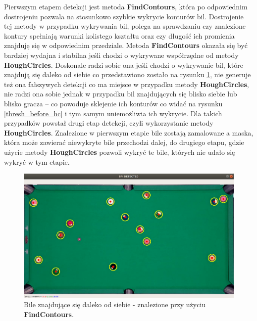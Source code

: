 \documentclass[12pt]{article}
\begin{document}
    Pierwszym etapem detekcji jest metoda \textbf{FindContours}, która po odpowiednim dostrojeniu pozwala na stosunkowo szybkie wykrycie konturów bil. Dostrojenie tej metody w przypadku wykrywania bil, polega na sprawdzaniu czy znalezione kontury spełniają warunki kolistego kształtu oraz czy długość ich promienia znajduję się w odpowiednim przedziale. Metoda \textbf{FindContours} okazała się być bardziej wydajna i stabilna jeśli chodzi o wykrywane współrzędne od metody \textbf{HoughCircles}. Doskonale radzi sobie ona jeśli chodzi o wykrywanie bil, które znajdują się daleko od siebie co przedstawiono zostało na rysunku \ref{bp_detected}, nie generuje też ona fałszywych detekcji co ma miejsce w przypadku metody \textbf{HoughCircles}, nie radzi ona sobie jednak w przypadku bil znajdujących się blisko siebie lub blisko gracza – co powoduje sklejenie ich konturów co widać na rysunku \ref{thresh_before_hc} i tym samym uniemożliwia ich wykrycie. Dla takich przypadków powstał drugi etap detekcji, czyli wykorzystanie metody \textbf{HoughCircles}. Znalezione w pierwszym etapie bile zostają zamalowane a maska, która może zawierać niewykryte bile przechodzi dalej, do drugiego etapu, gdzie użycie metody \textbf{HoughCircles} pozwoli wykryć te bile, których nie udało się wykryć w tym etapie.

    \begin{figure}[!htb]
        \centering
        \includegraphics[width=15cm]{./images/obrazki/bp/bp_detected.png}
        \caption{Bile znajdujące się daleko od siebie - znalezione przy użyciu \textbf{FindContours}.}
        \label{bp_detected}
    \end{figure}
\end{document}
